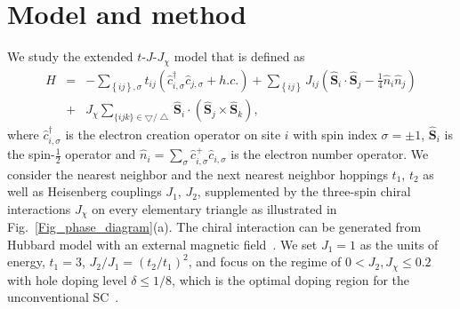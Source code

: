 \documentclass[aps,prx,reprint,superscriptaddress,showpacs]{revtex4-2}
\begin{document}
\section{Model and method}
\label{model_method}
We study the extended $t$-$J$-$J_{\chi}$ model that is defined as 
\begin{eqnarray}
\label{eq1}
H &=& -\sum\limits_{\left \{ ij \right \},\sigma
}t_{ij}(\widehat{c}^{\dagger }_{i,\sigma }\widehat{c}_{j,\sigma }+h.c.) + \sum\limits_{ \left \{ ij \right \} } J_{ij}(\widehat{\boldsymbol{S}}_{i}\cdot \widehat{\boldsymbol{S}}_{j}-\frac{1}{4}\widehat{n}_{i}\widehat{n}_{j})  \nonumber \\ &+& J_{\chi
}\sum\limits_{\{ ijk \} \in \bigtriangledown / \bigtriangleup  }\widehat{\boldsymbol{S}}_{i}\cdot (
\widehat{\boldsymbol{S}}_{j}\times \widehat{\boldsymbol{S}}_{k}),
\end{eqnarray} 
where $\widehat{c}_{i,\sigma}^{\dagger}$ is the electron creation operator on site $i$ with spin index $\sigma=\pm 1$, $\widehat{\boldsymbol{S}}_{i}$ is the spin-$\frac{1}{2}$ operator and  $\widehat{n}_{i}=\sum_{\sigma}\widehat{c}_{i,\sigma}^+\widehat{c}_{i,\sigma}$ is the  electron number operator.
We consider the  nearest neighbor and the next nearest neighbor hoppings $t_{1}$, $t_{2}$ as well as Heisenberg couplings $J_{1}$, $J_{2}$, supplemented by the three-spin chiral interactions $J_{\chi}$ on every elementary triangle as illustrated in Fig.~\ref{Fig_phase_diagram}(a). The chiral interaction can be generated from Hubbard model with an external magnetic field~\cite{jiang2020topological}.
We set $J_{1}=1$ as the units of energy, $t_{1}=3$, $J_{2}/J_{1}=(t_{2}/t_{1})^{2}$, and focus on the regime of $0<J_{2}, J_{\chi} \leq 0.2$ with hole doping level $\delta \leq 1/8$, which is the optimal doping region for the unconventional SC~\cite{jiang2020topological,gong2021robust}.
\end{document}
